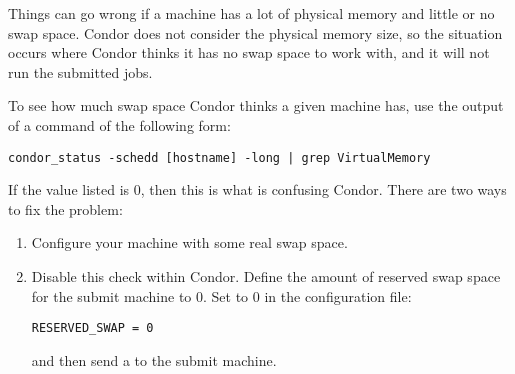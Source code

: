 Things can go wrong if a machine has a lot of physical memory and
little or no swap space.
Condor does not consider the physical memory size,
so the situation occurs where Condor thinks
it has no swap space to work with,
and it will not run the submitted jobs.

To see how much swap space Condor thinks a given machine has, use
the output of a  command of the following form:

\footnotesize
\begin{verbatim}
condor_status -schedd [hostname] -long | grep VirtualMemory
\end{verbatim}
\normalsize

If the value listed is 0, then this is what is confusing Condor.
There are two ways to fix the problem:

\begin{enumerate}
\item Configure your machine with some real swap space.

\item Disable this check within Condor.
Define the amount of reserved swap space for the submit machine to 0.
Set  to 0 in the configuration file:

\begin{verbatim}
RESERVED_SWAP = 0
\end{verbatim}

and then send a  to the submit machine.
\end{enumerate}

